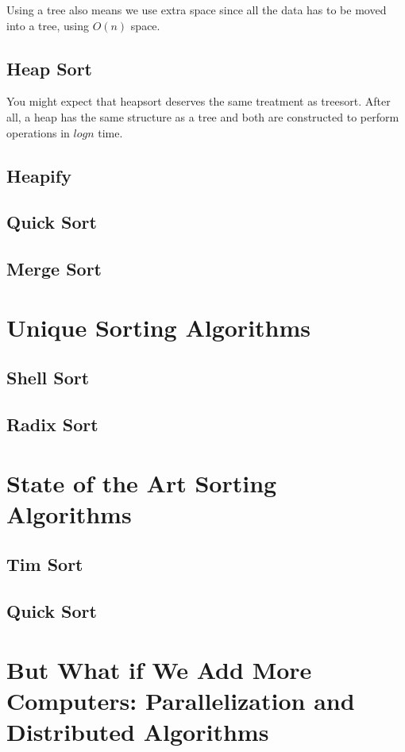 Using a tree also means we use extra space since all the data has to be moved into a tree, using $ O(n) $ space.
\subsection{Heap Sort}
You might expect that heapsort deserves the same treatment as treesort.
After all, a heap has the same structure as a tree and both are constructed to perform operations in $log n $ time.

\subsection{Heapify}

\subsection{Quick Sort}
\subsection{Merge Sort}



\section{Unique Sorting Algorithms}


\subsection{Shell Sort}

\subsection{Radix Sort}


\section{State of the Art Sorting Algorithms}

\subsection{Tim Sort}
\subsection{Quick Sort}
\section{But What if We Add More Computers: Parallelization and Distributed Algorithms}



